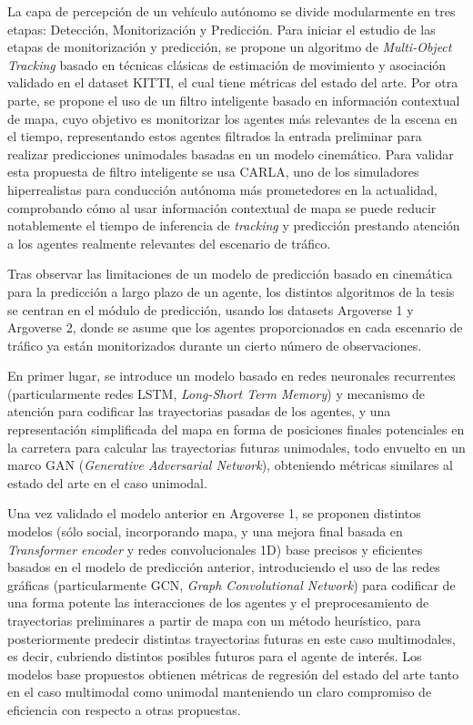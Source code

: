 La capa de percepción de un vehículo autónomo se divide modularmente en tres etapas: Detección, Monitorización y Predicción. Para iniciar el estudio de las etapas de monitorización y predicción, se propone un algoritmo de \textit{Multi-Object Tracking} basado en técnicas clásicas de estimación de movimiento y asociación validado en el dataset KITTI, el cual tiene métricas del estado del arte. Por otra parte, se propone el uso de un filtro inteligente basado en información contextual de mapa, cuyo objetivo es monitorizar los agentes más relevantes de la escena en el tiempo, representando estos agentes filtrados la entrada preliminar para realizar predicciones unimodales basadas en un modelo cinemático. Para validar esta propuesta de filtro inteligente se usa CARLA, uno de los simuladores hiperrealistas para conducción autónoma más prometedores en la actualidad, comprobando cómo al usar información contextual de mapa se puede reducir notablemente el tiempo de inferencia de \textit{tracking} y predicción prestando atención a los agentes realmente relevantes del escenario de tráfico.

Tras observar las limitaciones de un modelo de predicción basado en cinemática para la predicción a largo plazo de un agente, los distintos algoritmos de la tesis se centran en el módulo de predicción, usando los datasets Argoverse 1 y Argoverse 2, donde se asume que los agentes proporcionados en cada escenario de tráfico ya están monitorizados durante un cierto número de observaciones. 

En primer lugar, se introduce un modelo basado en redes neuronales recurrentes (particularmente redes LSTM, \textit{Long-Short Term Memory}) y mecanismo de atención para codificar las trayectorias pasadas de los agentes, y una representación simplificada del mapa en forma de posiciones finales potenciales en la carretera para calcular las trayectorias futuras unimodales, todo envuelto en un marco GAN (\textit{Generative Adversarial Network}), obteniendo métricas similares al estado del arte en el caso unimodal.

Una vez validado el modelo anterior en Argoverse 1, se proponen distintos modelos (sólo social, incorporando mapa, y una mejora final basada en \textit{Transformer encoder} y redes convolucionales 1D) base precisos y eficientes basados en el modelo de predicción anterior, introduciendo el uso de las redes gráficas (particularmente GCN, \textit{Graph Convolutional Network}) para codificar de una forma potente las interacciones de los agentes y el preprocesamiento de trayectorias preliminares a partir de mapa con un método heurístico, para posteriormente predecir distintas trayectorias futuras en este caso multimodales, es decir, cubriendo distintos posibles futuros para el agente de interés. Los modelos base propuestos obtienen métricas de regresión del estado del arte tanto en el caso multimodal como unimodal manteniendo un claro compromiso de eficiencia con respecto a otras propuestas.

